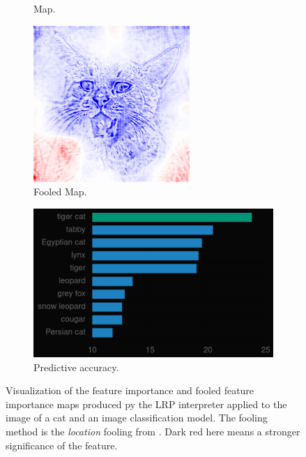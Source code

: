\begin{figure}[ht]
\begin{subfigure}{0.32\linewidth}
      \caption{Map.}
      \label{fig:lrp_cat_lrp}
    \end{subfigure}
    \begin{subfigure}{0.32\linewidth}
      \includegraphics[width=\linewidth]{figures/foolignns/location fooling lrp/lrp_epoch6_no-7.png}
      \caption{Fooled Map.}
      \label{fig:lrp_cat_fooled_lrp}
    \end{subfigure}
    \begin{subfigure}{0.8\linewidth}
        \includegraphics[width=\linewidth]{figures/cat_classification.png}
        \caption{Predictive accuracy.}
        \label{fig:cat_classification}
    \end{subfigure}
    \caption{Visualization of the feature importance and fooled feature importance maps produced py the LRP interpreter applied to the image of a cat and an image classification model. The fooling method is the \textit{location} fooling from \cite{fooling_nn_interpreters}. Dark red here means a stronger significance of the feature.}\label{fig:lrp_cat}
    \vspace{-0.3cm}
\end{figure}


